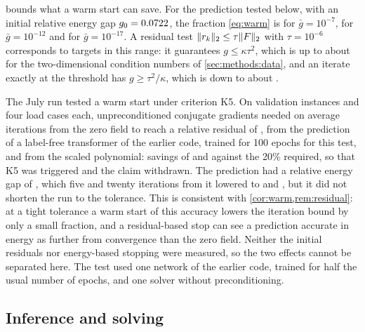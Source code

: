  bounds what a warm start can save. For the prediction tested below, with an
initial relative energy gap $g_0=0.0722$, the fraction \eqref{eq:warm} is
\numWarmFractionSeven{} for $\bar g=10^{-7}$, \numWarmFractionTwelve{} for
$\bar g=10^{-12}$ and \numWarmFractionSeventeen{} for $\bar g=10^{-17}$. A residual test
$\lVert r_k\rVert_2\le\tau\lVert F\rVert_2$ with $\tau=10^{-6}$ corresponds to targets in this range:
it guarantees $g\le\kappa\tau^2$, which is up to about \numKappaTauTwo{} for the
two-dimensional condition numbers of \cref{sec:methods:data}, and an iterate exactly at the
threshold has $g\ge\tau^2/\kappa$, which is down to about \numTauSqKappaTwo{}.

The July run tested a warm start under criterion K5. On \numKfiveEval{} validation
instances and four load cases each, unpreconditioned conjugate gradients needed on average
\numKfiveZero{} iterations from the zero field to reach a relative residual of
\numKfiveTol{}, \numKfiveFree{} from the prediction of a label-free transformer of the
earlier code, trained for 100 epochs for this test, and \numKfiveNaive{} from the scaled
polynomial: savings of \numKfiveSaving{} and \numKfiveNaiveSaving{} against the 20\%
required, so that K5 was triggered and the claim withdrawn. The prediction had a relative
energy gap of \numKfiveStartGap{}, which five and twenty iterations from it lowered to
\numKfiveFiveGap{} and \numKfiveTwentyGap{}, but it did not shorten the run to the
tolerance. This is consistent with \cref{cor:warm,rem:residual}: at a tight tolerance a
warm start of this accuracy lowers the iteration bound by only a small fraction, and a
residual-based stop can see a prediction accurate in energy as further from convergence
than the zero field. Neither the initial residuals nor energy-based stopping were measured,
so the two effects cannot be separated here. The test used one network of the earlier code,
trained for half the usual number of epochs, and one solver without preconditioning.

\subsection{Inference and solving}\label{sec:cost:inference}



